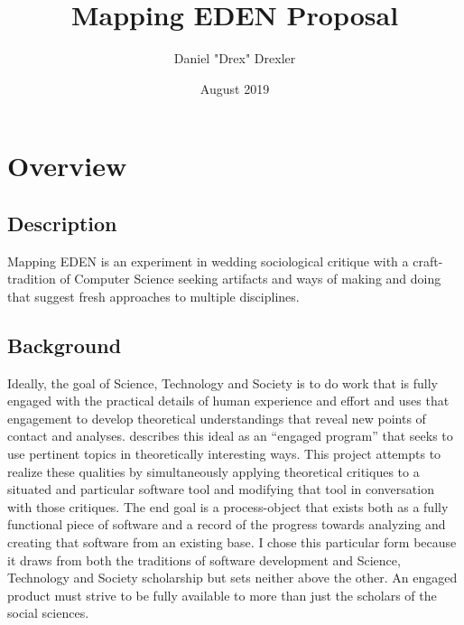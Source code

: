 \documentclass[a4paper,man,natbib]{apa6}
\title{Mapping EDEN Proposal}
\author{Daniel "Drex" Drexler}
\affiliation{Center for Science, Technology and Society at Drexel University}
\date{August 2019}
\begin{document}
   \maketitle

   \section*{Overview}
   \subsection*{Description}
   Mapping EDEN is an experiment in wedding sociological critique with a craft-tradition of Computer Science seeking artifacts and ways of making and doing that suggest fresh approaches to multiple disciplines.
   \subsection*{Background}
   Ideally, the goal of Science, Technology and Society is to do work that is fully engaged with the practical details of human experience and effort and uses that engagement to develop theoretical understandings that reveal new points of contact and analyses. \citet{Sismondo2008-xz} describes this ideal as an “engaged program” that seeks to use pertinent topics in theoretically interesting ways. This project attempts to realize these qualities by simultaneously applying theoretical critiques to a situated and particular software tool and modifying that tool in conversation with those critiques. The end goal is a process-object that exists both as a fully functional piece of software and a record of the progress towards analyzing and creating that software from an existing base. I chose this particular form because it draws from both the traditions of software development and Science, Technology and Society scholarship but sets neither above the other. An engaged product must strive to be fully available to more than just the scholars of the social sciences.
\end{document}
